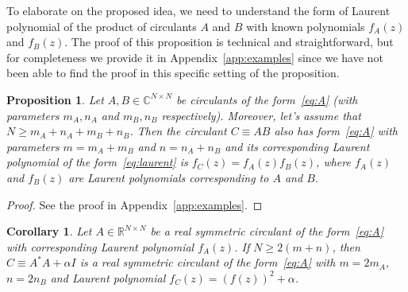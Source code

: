 \documentclass[a4paper]{article}
\newtheorem{corollary}{Corollary}[section]
\newtheorem{proposition}{Proposition}[section]
\begin{document}
	To elaborate on the proposed idea, we need to understand the form of Laurent polynomial of the product of circulants $A$ and $B$ with known polynomials $f_A(z)$ and $f_B(z)$. The proof of this proposition is technical and straightforward, but for completeness we provide it in Appendix~\ref{app:examples} since we have not been able to find the proof in this specific setting of the proposition.
	
	\begin{proposition}\label{prop:laur_prod}
	Let $A,B \in \mathbb{C}^{N \times N}$ be circulants of the form~\eqref{eq:A} (with parameters $m_A, n_A$ and $m_B, n_B$ respectively).
	Moreover, let's assume that $N \ge m_A+n_A+m_B+n_B$.
	Then the circulant $C \equiv AB$ also has form~\eqref{eq:A} with parameters $m = m_A + m_B$ and $n = n_A+n_B$ and its corresponding Laurent polynomial of the form~\eqref{eq:laurent} is $f_C(z) = f_A(z)f_B(z)$, where $f_A(z)$ and $f_B(z)$ are Laurent polynomials corresponding to $A$ and $B$.
	\end{proposition}
	\begin{proof}
	    See the proof in Appendix~\ref{app:examples}.
	\end{proof}
	
	\begin{corollary}\label{cor:AstarA}
	Let $A \in \mathbb{R}^{N \times N}$ be a real symmetric circulant of the form~\eqref{eq:A} with corresponding Laurent polynomial $f_A(z)$.
	If $N \ge 2(m+n)$, then $C \equiv A^*A+\alpha I$ is a real symmetric circulant of the form~\eqref{eq:A} with $m = 2m_A$, $n = 2n_B$ and Laurent polynomial $f_C(z) = (f(z))^2 + \alpha$.
	\end{corollary}
	
\end{document}

